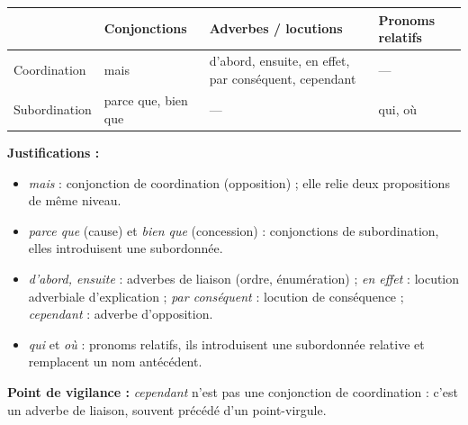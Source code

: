 \documentclass[11pt]{article}
\begin{document}
\begin{corrige}
\begin{center}
\begin{tabularx}{\linewidth}{|l|X|X|X|}\hline
\rowcolor{popblueL} & \textbf{Conjonctions} & \textbf{Adverbes / locutions} & \textbf{Pronoms relatifs} \\ \hline
Coordination & mais & d'abord, ensuite, en effet, par conséquent, cependant & --- \\ \hline
Subordination & parce que, bien que & --- & qui, où \\ \hline
\end{tabularx}
\end{center}
\textbf{Justifications :}
\begin{itemize}
\item \emph{mais} : conjonction de coordination (opposition) ; elle relie deux propositions de même niveau.
\item \emph{parce que} (cause) et \emph{bien que} (concession) : conjonctions de subordination, elles introduisent une subordonnée.
\item \emph{d'abord, ensuite} : adverbes de liaison (ordre, énumération) ; \emph{en effet} : locution adverbiale d'explication ; \emph{par conséquent} : locution de conséquence ; \emph{cependant} : adverbe d'opposition.
\item \emph{qui} et \emph{où} : pronoms relatifs, ils introduisent une subordonnée relative et remplacent un nom antécédent.
\end{itemize}
\textbf{Point de vigilance :} \emph{cependant} n'est pas une conjonction de coordination : c'est un adverbe de liaison, souvent précédé d'un point-virgule.
\end{corrige}
\end{document}
